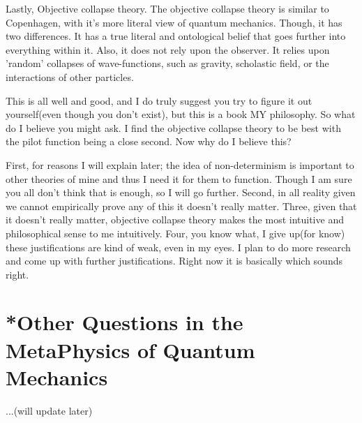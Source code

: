 \par Lastly, Objective collapse theory. The objective collapse theory is similar to Copenhagen, with it's more literal view of quantum mechanics. Though, it has two differences. It has a true literal and ontological belief that goes further into everything within it. Also, it does not rely upon the observer. It relies upon 'random' collapses of wave-functions, such as gravity, scholastic field, or the interactions of other particles.
\par This is all well and good, and I do truly suggest you try to figure it out yourself(even though you don't exist), but this is a book MY philosophy. So what do I believe you might ask. I find the objective collapse theory to be best with the pilot function being a close second. Now why do I believe this?
\par First, for reasons I will explain later; the idea of non-determinism is important to other theories of mine and thus I need it for them to function. Though I am sure you all don't think that is enough, so I will go further. Second, in all reality given we cannot empirically prove any of this it doesn't really matter. Three, given that it doesn't really matter, objective collapse theory makes the most intuitive and philosophical sense to me intuitively. Four, you know what, I give up(for know) these justifications are kind of weak, even in my eyes. I plan to do more research and come up with further justifications. Right now it is basically which sounds right.
\section{*Other Questions in the MetaPhysics of Quantum Mechanics}
\par ...(will update later)
